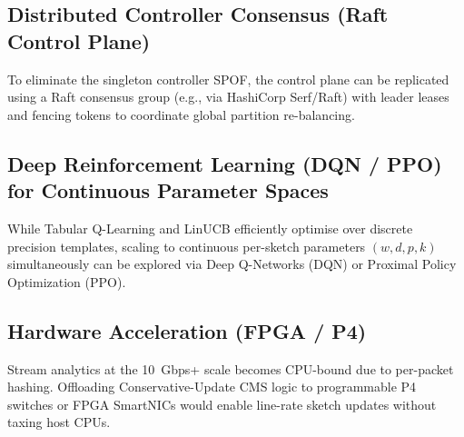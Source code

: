 \subsection{Distributed Controller Consensus (Raft Control Plane)}

To eliminate the singleton controller SPOF, the control plane can be replicated using a Raft consensus group (e.g., via HashiCorp Serf/Raft) with leader leases and fencing tokens to coordinate global partition re-balancing.

\subsection{Deep Reinforcement Learning (DQN / PPO) for Continuous Parameter Spaces}

While Tabular Q-Learning and LinUCB efficiently optimise over discrete precision templates, scaling to continuous per-sketch parameters $(w, d, p, k)$ simultaneously can be explored via Deep Q-Networks (DQN) or Proximal Policy Optimization (PPO).

\subsection{Hardware Acceleration (FPGA / P4)}

Stream analytics at the 10~Gbps+ scale becomes CPU-bound due to per-packet hashing. Offloading Conservative-Update CMS logic to programmable P4 switches or FPGA SmartNICs would enable line-rate sketch updates without taxing host CPUs.